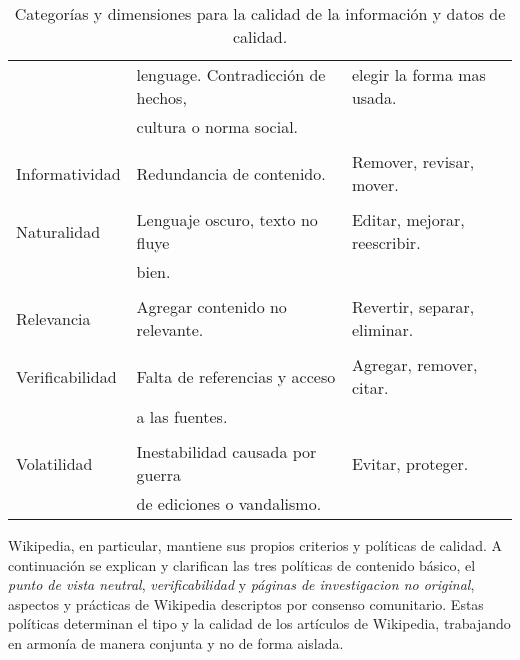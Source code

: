 \begin{table}
\begin{tabular}{ l l l }
     	          &  lenguage. Contradicci\'on de hechos, & elegir la forma mas usada. \\
     	          & cultura o norma social. & \\ \\
     	          Informatividad & Redundancia de contenido. & Remover, revisar, mover. \\ \\
	          Naturalidad & Lenguaje oscuro, texto no fluye & Editar, mejorar, reescribir. \\
		& bien. & \\ \\
	          Relevancia & Agregar contenido no relevante. & Revertir, separar, eliminar. \\ \\
	          Verificabilidad & Falta de referencias y acceso & Agregar, remover, citar. \\
		& a las fuentes. &  \\ \\
		Volatilidad & Inestabilidad causada por guerra & Evitar, proteger. \\
		& de ediciones o vandalismo. & \\
	\hline
\end{tabular}
\caption {Categor\'ias y dimensiones para la calidad de la informaci\'on y datos de calidad.}
\label{table:problemas}
\end{table}

Wikipedia, en particular, mantiene sus propios criterios y pol\'iticas de calidad. A continuaci\'on se explican y clarifican las tres pol\'iticas de contenido b\'asico, el \emph{punto de vista neutral}, \emph{verificabilidad} y \emph{p\'aginas de investigacion no original}, aspectos y pr\'acticas de Wikipedia descriptos por consenso comunitario. Estas pol\'iticas determinan el tipo y la calidad de los art\'iculos de Wikipedia, trabajando en armon\'ia de manera conjunta y no de forma aislada.

